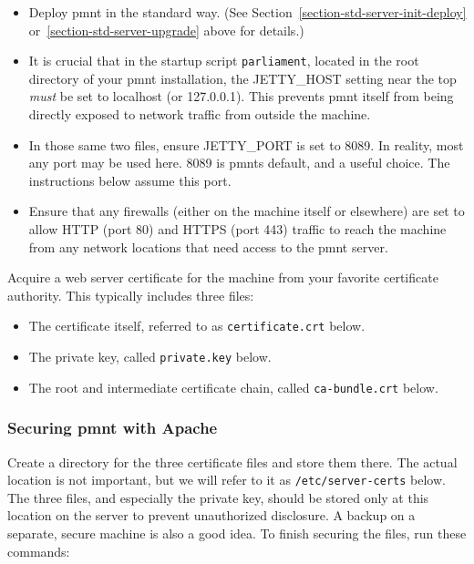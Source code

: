 \begin{itemize}
	\item Deploy \ac{pmnt} in the standard way.  (See Section~\ref{section-std-server-init-deploy} or~\ref{section-std-server-upgrade} above for details.)

	\item It is crucial that in the startup script \texttt{parliament}, located in the root directory of your \ac{pmnt} installation, the JETTY\_HOST setting near the top \emph{must} be set to localhost (or 127.0.0.1).  This prevents \ac{pmnt} itself from being directly exposed to network traffic from outside the machine.

	\item In those same two files, ensure JETTY\_PORT is set to 8089.  In reality, most any port may be used here.  8089 is \acp{pmnt} default, and a useful choice.  The instructions below assume this port.

	\item Ensure that any firewalls (either on the machine itself or elsewhere) are set to allow HTTP (port 80) and HTTPS (port 443) traffic to reach the machine from any network locations that need access to the \ac{pmnt} server.
\end{itemize}

Acquire a web server certificate for the machine from your favorite certificate authority.  This typically includes three files:

\begin{itemize}
	\item The certificate itself, referred to as \texttt{certificate.crt} below.

	\item The private key, called \texttt{private.key} below.

	\item The root and intermediate certificate chain, called \texttt{ca-bundle.crt} below.
\end{itemize}



\subsubsection{Securing \ac{pmnt} with Apache}
\label{section-securing-parliament-apache}

Create a directory for the three certificate files and store them there.  The actual location is not important, but we will refer to it as \texttt{/etc/server-certs} below.  The three files, and especially the private key, should be stored only at this location on the server to prevent unauthorized disclosure.  A backup on a separate, secure machine is also a good idea.  To finish securing the files, run these commands:

